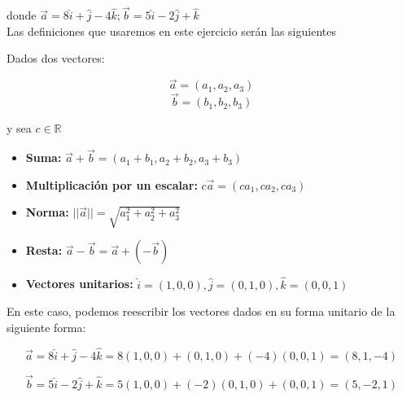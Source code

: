 \documentclass[12pt]{article}
\begin{document}
donde $\vec{a}=8\hat{i} + \hat{j} - 4\hat{k}; \vec{b}= 5\hat{i} - 2\hat{j} +\hat{k}$ \\

Las definiciones que usaremos en este ejercicio serán las siguientes

Dados dos vectores:

\[ \vec{a} = (a_1, a_2, a_3) \]
\[ \vec{b} = (b_1,b_2, b_3) \]

y sea $c \in \mathds{R}$

\begin{itemize}
  
\item \textbf{Suma:} $\vec{a} + \vec{b}  = (a_1 + b_1, a_2+b_2, a_3+b_3)$
  
\item \textbf{Multiplicación por un escalar:} $c\vec{a} = (ca_1, ca_2, ca_3)$
  
\item \textbf{Norma:} $||\vec{a}|| = \sqrt{a_1^2 + a_2^2 + a_3^2}$
  
\item \textbf{Resta:}  $\vec{a} - \vec{b} = \vec{a} + (-\vec{b})$
  
\item \textbf{Vectores unitarios:} $\hat{i} = (1, 0, 0),  \hat{j} = (0, 1, 0),  \hat{k} = (0, 0, 1)$

\end{itemize}

En este caso, podemos reescribir los vectores dados en su forma unitario de la siguiente forma:

\[
\vec{a} = 8\hat{i} + \hat{j} - 4\hat{k} = 8(1, 0, 0) + (0,1,0) + (-4) (0,0,1) = (8, 1, -4)
\]

\[
\vec{b} = 5\hat{i} - 2\hat{j} +\hat{k} = 5(1, 0, 0) + (-2) (0,1,0) + (0,0,1) = (5, -2, 1)
\]
\end{document}
